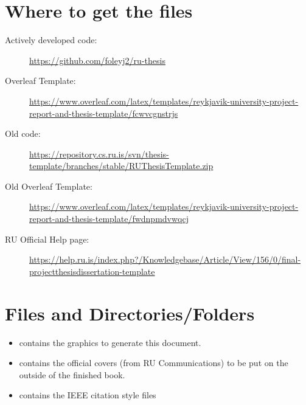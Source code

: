 \section{Where to get the files}
\begin{description}
\item [Actively developed code:] \url{https://github.com/foleyj2/ru-thesis}\item [Overleaf Template:]  \url{https://www.overleaf.com/latex/templates/reykjavik-university-project-report-and-thesis-template/fcwvcgnstrjs}
\item [Old code:] \url{https://repository.cs.ru.is/svn/thesis-template/branches/stable/RUThesisTemplate.zip}
\item [Old Overleaf Template:]
\url{https://www.overleaf.com/latex/templates/reykjavik-university-project-report-and-thesis-template/fwdnpmdvwqcj}
\item [RU Official Help page:]
\url{https://help.ru.is/index.php?/Knowledgebase/Article/View/156/0/final-projectthesisdissertation-template}
\end{description}


\section{Files and Directories/Folders}
\begin{itemize}
\item {} contains the graphics to generate this document.
\item {} contains the official covers (from RU Communications) to be put on the outside of the finished book.
\item {} contains the IEEE citation style files
\end{itemize}

